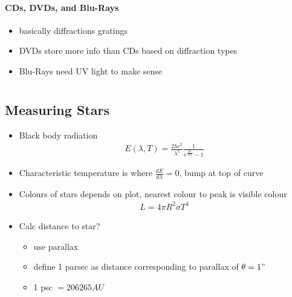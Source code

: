\documentclass[a4paper,11pt,normalem]{article}
\begin{document}
\paragraph{CDs, DVDs, and Blu-Rays}

\begin{itemize}
    \item basically diffractions gratings
    \item DVDs store more info than CDs based on diffraction types
    \item Blu-Rays need UV light to make sense
\end{itemize}

\section{}
\subsection{Measuring Stars}

\begin{itemize}
    \item Black body radiation
        \begin{align*}
            E(\lambda, T) = \frac{2hc^2}{\lambda^5} \frac{1}{e^{\tfrac{hc}{\lambda kT}} - 1}
        \end{align*}
    \item Characteristic temperature is where \(\frac{dE}{d\lambda} = 0\), bump at top of curve
    \item Colours of stars depends on plot, nearest colour to peak is visible colour
        \begin{align*}
            L = 4\pi R^2 \sigma T^4
        \end{align*}
    \item Calc distance to star?
        \begin{itemize}
            \item use parallax
            \item define 1 parsec as distance corresponding to parallax of \(\theta = 1"\)
            \item 1 psc \(= 206265 AU\)
        \end{itemize}
\end{itemize}
\end{document}
